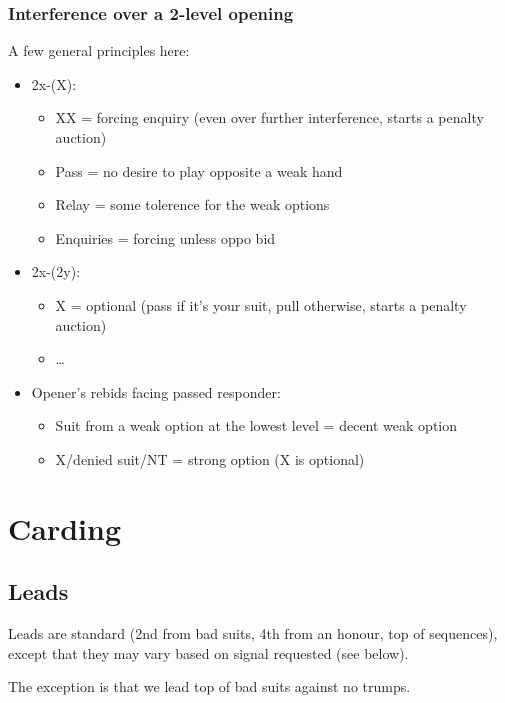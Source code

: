 \documentclass[a4paper,14pt]{extarticle}
\begin{document}
\subsubsection{Interference over a 2-level opening}
\label{sec:intf:2level}

A few general principles here:

\begin{itemize}
\item 2x-(X):
   \begin{itemize}
      \item XX = forcing enquiry (even over further interference, starts a penalty auction)
      \item Pass = no desire to play opposite a weak hand
      \item Relay = some tolerence for the weak options
      \item Enquiries = forcing unless oppo bid
   \end{itemize}
\item 2x-(2y):
   \begin{itemize}
      \item X = optional (pass if it's your suit, pull otherwise, starts a penalty auction)
      \item \ldots
   \end{itemize}
\item Opener's rebids facing passed responder:
   \begin{itemize}
   \item Suit from a weak option at the lowest level = decent weak option
   \item X/denied suit/NT = strong option (X is optional)
   \end{itemize}
\end{itemize}

\newpage

\section{Carding}
\label{sec:carding}

\subsection{Leads}
\label{sec:card:leads}

Leads are standard (2nd from bad suits, 4th from an honour, top of sequences),
except that they may vary based on signal requested (see below).

The exception is that we lead top of bad suits against no trumps.
\end{document}
